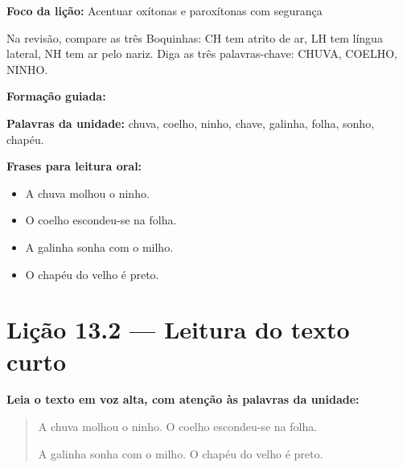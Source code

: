 \textbf{Foco da lição:} Acentuar oxítonas e paroxítonas com segurança


\begin{boquinha}
Na revisão, compare as três Boquinhas: CH tem atrito de ar, LH tem língua lateral, NH tem ar pelo nariz. Diga as três palavras-chave: CHUVA, COELHO, NINHO.
\end{boquinha}

\noindent\textbf{Formação guiada:}

\begin{center}
\end{center}

\noindent\textbf{Palavras da unidade:} chuva, coelho, ninho, chave, galinha, folha, sonho, chapéu.

\noindent\textbf{Frases para leitura oral:}
\begin{itemize}[leftmargin=1.6em]
  \item A chuva molhou o ninho.
  \item O coelho escondeu-se na folha.
  \item A galinha sonha com o milho.
  \item O chapéu do velho é preto.
\end{itemize}

\section{Lição 13.2 --- Leitura do texto curto}

\noindent\textbf{Leia o texto em voz alta, com atenção às palavras da unidade:}


\begin{quote}
A chuva molhou o ninho. O coelho escondeu-se na folha.

A galinha sonha com o milho. O chapéu do velho é preto.
\end{quote}

